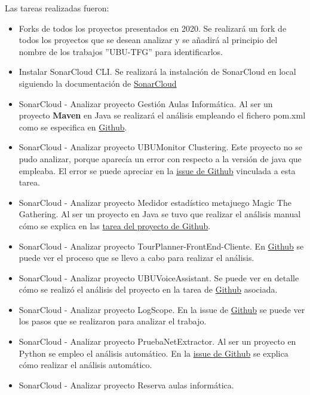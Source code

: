 Las tareas realizadas fueron:
\begin{itemize}
	\tightlist
	\item Forks de todos los proyectos presentados en 2020.
		Se realizará un fork de todos los proyectos que se desean analizar y se añadirá al principio del nombre de los trabajos ''UBU-TFG'' para identificarlos. 
	\item Instalar SonarCloud CLI.
		Se realizará la instalación de SonarCloud en local siguiendo la documentación de \href{https://sonarcloud.io/documentation/analysis/scan/sonarscanner/}{SonarCloud} 
	\item SonarCloud - Analizar proyecto Gestión Aulas Informática. 
		Al ser un proyecto \textbf{Maven} en Java se realizará el análisis empleando el fichero pom.xml como se especifica en \href{https://github.com/dbo1001/Gestor-TFG-2021/issues/70}{Github}. 
	\item SonarCloud - Analizar proyecto UBUMonitor Clustering.  
		Este proyecto no se pudo analizar, porque aparecía un error con respecto a la versión de java que empleaba. El error se puede apreciar en la \href{https://github.com/dbo1001/Gestor-TFG-2021/issues/72}{issue de Github} vinculada a esta tarea. 
	\item SonarCloud - Analizar proyecto Medidor estadístico metajuego Magic The Gathering.  
		Al ser un proyecto en Java se tuvo que realizar el análisis manual cómo se explica en las \href{https://github.com/dbo1001/Gestor-TFG-2021/issues/71}{tarea del proyecto de Github}.
	\item SonarCloud - Analizar proyecto TourPlanner-FrontEnd-Cliente.  
		En \href{https://github.com/dbo1001/Gestor-TFG-2021/issues/74}{Github} se puede ver el proceso que se llevo a cabo para realizar el análisis.
	\item SonarCloud - Analizar proyecto UBUVoiceAssistant. 
		Se puede ver en detalle cómo se realizó el análisis del proyecto en la tarea de \href{https://github.com/dbo1001/Gestor-TFG-2021/issues/76}{Github} asociada.
	\item SonarCloud - Analizar proyecto LogScope. 
		En la issue de \href{https://github.com/dbo1001/Gestor-TFG-2021/issues/75}{Github} se puede ver los pasos que se realizaron para analizar el trabajo.
	\item SonarCloud - Analizar proyecto PruebaNetExtractor. 
		Al ser un proyecto en Python se empleo el análisis automático. En la \href{https://github.com/dbo1001/Gestor-TFG-2021/issues/79}{issue de Github} se explica cómo realizar el análisis automático.
	\item SonarCloud - Analizar proyecto Reserva aulas informática. 

\end{itemize}
